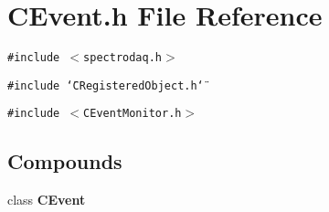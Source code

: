 \section{CEvent.h File Reference}
\label{CEvent_8h}
{\tt \#include $<$spectrodaq.h$>$}\par
{\tt \#include \char`\"{}CRegistered\-Object.h\char`\"{}}\par
{\tt \#include $<$CEvent\-Monitor.h$>$}\par
\subsection*{Compounds}
\begin{CompactItemize}
\item 
class {\bf CEvent}
\end{CompactItemize}
